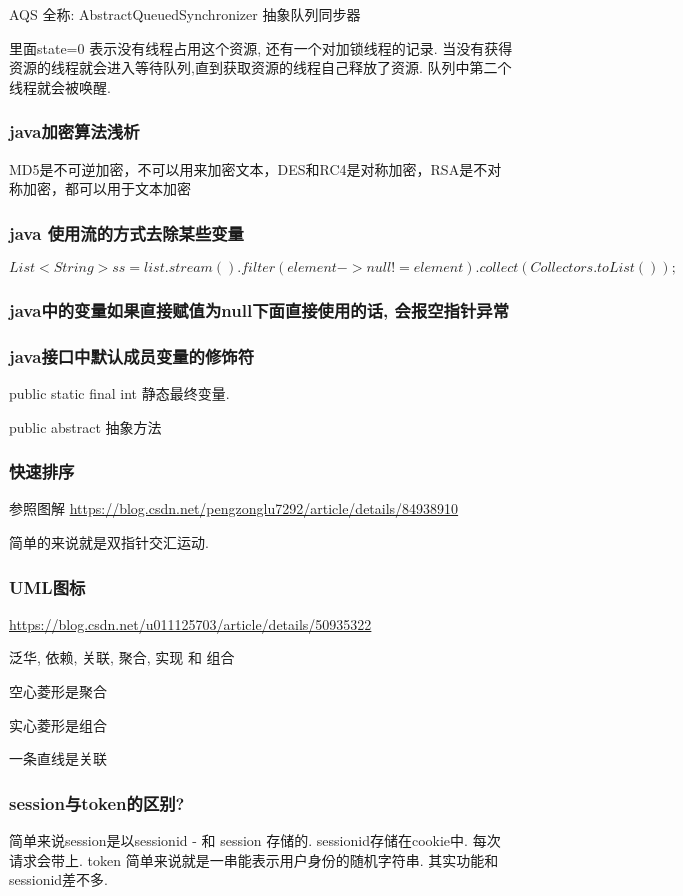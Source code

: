 \documentclass[UTF8]{ctexart}
\begin{document}
AQS 全称: AbstractQueuedSynchronizer 抽象队列同步器

里面state=0 表示没有线程占用这个资源, 还有一个对加锁线程的记录. 当没有获得资源的线程就会进入等待队列,直到获取资源的线程自己释放了资源. 队列中第二个线程就会被唤醒.

\subsubsection{java加密算法浅析}

MD5是不可逆加密，不可以用来加密文本，DES和RC4是对称加密，RSA是不对称加密，都可以用于文本加密
\subsubsection{java 使用流的方式去除某些变量}
$$
	List<String> ss = list.stream().filter(element->null!=element).collect(Collectors.toList());
$$
\subsubsection{java中的变量如果直接赋值为null下面直接使用的话, 会报空指针异常}


\subsubsection{java接口中默认成员变量的修饰符}

public static final int 静态最终变量.

public abstract  抽象方法

\subsubsection{快速排序}
参照图解
\url{https://blog.csdn.net/pengzonglu7292/article/details/84938910}

简单的来说就是双指针交汇运动.




\subsubsection{UML图标}

\url{https://blog.csdn.net/u011125703/article/details/50935322}

泛华, 依赖, 关联, 聚合, 实现 和 组合

空心菱形是聚合

实心菱形是组合

一条直线是关联


\subsubsection{session与token的区别?}
简单来说session是以sessionid - 和 session 存储的. sessionid存储在cookie中. 每次请求会带上.
token 简单来说就是一串能表示用户身份的随机字符串. 其实功能和sessionid差不多.
\end{document}
